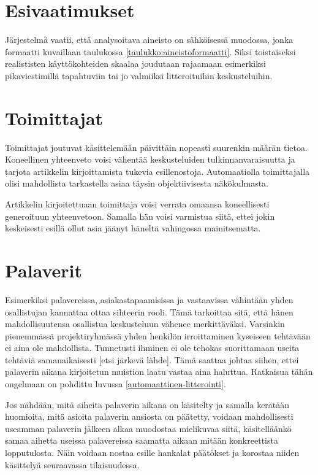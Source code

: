 \documentclass[11pt,a4paper,oneside]{memoir}
\begin{document}
\section{Esivaatimukset}
Järjestelmä vaatii, että analysoitava aineisto on sähköisessä muodossa, jonka formaatti kuvaillaan taulukossa \ref{taulukko:aineistoformaatti}. Siksi toistaiseksi realististen käyttökohteiden skaalaa joudutaan rajaamaan esimerkiksi pikaviestimillä tapahtuviin tai jo valmiiksi litteroituihin keskusteluihin.

\section{Toimittajat}
Toimittajat joutuvat käsittelemään päivittäin nopeasti suurenkin määrän tietoa. Koneellinen yhteenveto voisi vähentää keskusteluiden tulkinnanvaraisuutta ja tarjota artikkelin kirjoittamista tukevia esillenostoja. Automaatiolla toimittajalla olisi mahdollista tarkastella asiaa täysin objektiivisesta näkökulmasta.

Artikkelin kirjoitettuaan toimittaja voisi verrata omaansa koneellisesti generoituun yhteenvetoon. Samalla hän voisi varmistua siitä, ettei jokin keskeisesti esillä ollut asia jäänyt häneltä vahingossa mainitsematta.

\section{Palaverit}
Esimerkiksi palavereissa, asiakastapaamisissa ja vastaavissa vähintään yhden osallistujan kannattaa ottaa sihteerin rooli. Tämä tarkoittaa sitä, että hänen mahdollisuutensa osallistua keskusteluun vähenee merkittäväksi. Varsinkin pienemmässä projektiryhmässä yhden henkilön irroittaminen kyseiseen tehtävään ei aina ole mahdollista. Tunnetusti ihminen ei ole tehokas suorittamaan useita tehtäviä samanaikaisesti [etsi järkevä lähde]. Tämä saattaa johtaa siihen, ettei palaverin aikana kirjoitetun muistion laatu vastaa aina haluttua. Ratkaisua tähän ongelmaan on pohdittu luvussa \ref{automaattinen-litterointi}.

Jos nähdään, mitä aiheita palaverin aikana on käsitelty ja samalla kerätään huomioita, mitä asioita palaverin ansiosta on päätetty, voidaan mahdollisesti useamman palaverin jälkeen alkaa muodostaa mielikuvaa siitä, käsitelläänkö samaa aihetta useissa palavereissa saamatta aikaan mitään konkreettista lopputulosta. Näin voidaan nostaa esille hankalat päätökset ja korostaa niiden käsittelyä seuraavassa tilaisuudessa.
\end{document}
